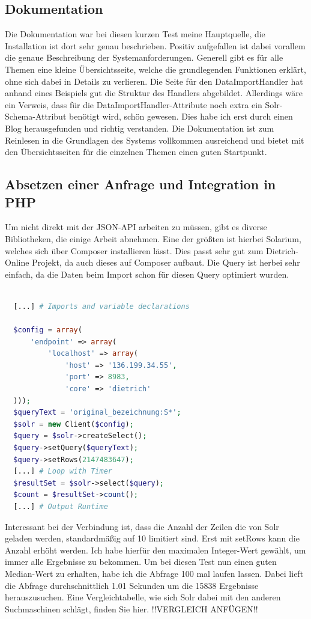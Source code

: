 \subsection{Dokumentation}

Die Dokumentation war bei diesen kurzen Test meine Hauptquelle, die Installation ist dort sehr genau beschrieben. Positiv aufgefallen ist dabei vorallem die genaue Beschreibung der Systemanforderungen. Generell gibt es für alle Themen eine kleine Übersichtsseite, welche die grundlegenden Funktionen erklärt, ohne sich dabei in Details zu verlieren. 
Die Seite für den DataImportHandler hat anhand eines Beispiels gut die Struktur des Handlers abgebildet. Allerdings wäre ein Verweis, dass für die DataImportHandler-Attribute noch extra ein Solr-Schema-Attribut benötigt wird, schön gewesen. Dies habe ich erst durch einen Blog \cite{IqubalMustafaKaki.2016} herausgefunden und richtig verstanden. 
Die Dokumentation ist zum Reinlesen in die Grundlagen des Systems vollkommen ausreichend und bietet mit den Übersichtsseiten für die einzelnen Themen einen guten Startpunkt.

\subsection{Absetzen einer Anfrage und Integration in PHP}

Um nicht direkt mit der JSON-API arbeiten zu müssen, gibt es diverse Bibliotheken, die einige Arbeit abnehmen. Eine der größten ist hierbei Solarium, welches sich über Composer installieren lässt. Dies passt sehr gut zum Dietrich-Online Projekt, da auch dieses auf Composer aufbaut. Die Query ist herbei sehr einfach, da die Daten beim Import schon für diesen Query optimiert wurden.

\begin{lstlisting}[language=php, frame=single, label={lst:managedSchema}, 
  morekeywords={type,uninvertible,indexed,stored,field,multiValued, name}] 

  [...] # Imports and variable declarations

  $config = array(
      'endpoint' => array(
          'localhost' => array(
              'host' => '136.199.34.55',
              'port' => 8983,
              'core' => 'dietrich'
  )));
  $queryText = 'original_bezeichnung:S*';
  $solr = new Client($config);
  $query = $solr->createSelect();
  $query->setQuery($queryText);
  $query->setRows(2147483647); 
  [...] # Loop with Timer
  $resultSet = $solr->select($query);
  $count = $resultSet->count();
  [...] # Output Runtime
\end{lstlisting}

Interessant bei der Verbindung ist, dass die Anzahl der Zeilen die von Solr geladen werden, standardmäßig auf 10 limitiert sind. Erst mit setRows kann die Anzahl erhöht werden. Ich habe hierfür den maximalen Integer-Wert gewählt, um immer alle Ergebnisse zu bekommen. Um bei diesen Test nun einen guten Median-Wert zu erhalten, habe ich die Abfrage 100 mal laufen lassen. Dabei lieft die Abfrage durchschnittlich 1.01 Sekunden um die 15838 Ergebnisse herauszusuchen. Eine Vergleichtabelle, wie sich Solr dabei mit den anderen Suchmaschinen schlägt, finden Sie hier. !!VERGLEICH ANFÜGEN!!
